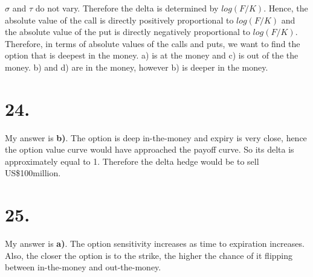 \documentclass[paper=a4, fontsize=11pt]{scrartcl} %
\numberwithin{equation}{section} %
\numberwithin{figure}{section} %
\numberwithin{table}{section} %
\begin{document}
$\sigma$ and $\tau$ do not vary.  Therefore the delta is determined by $log(F/K)$.  Hence, the absolute value of the call is directly positively proportional to $log(F/K)$ and the absolute value of the put is directly negatively proportional to $log(F/K)$.  \\

Therefore, in terms of absolute values of the calls and puts, we want to find the option that is deepest in the money.  a) is at the money and c) is out of the the money.  b) and d) are in the money, however b) is deeper in the money.  

\section*{24.}

My answer is \textbf{b)}.  The option is deep in-the-money and expiry is very close, hence the option value curve would have approached the payoff curve. So its delta is approximately equal to 1.  Therefore the delta hedge would be to sell US\$100million.


\section*{25.}

My answer is \textbf{a)}.  The option sensitivity increases as time to expiration increases.  Also, the closer the option is to the strike, the higher the chance of it flipping between in-the-money and out-the-money.  

\end{document}
